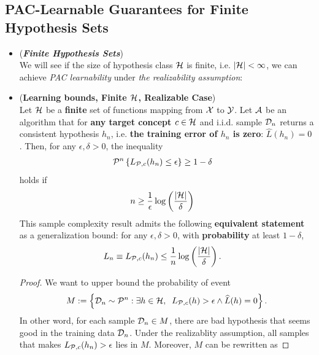 \documentclass[11pt]{article}
\begin{document}
\subsection{PAC-Learnable Guarantees for Finite Hypothesis Sets}
\begin{itemize}
\item \begin{remark} (\emph{\textbf{Finite Hypothesis Sets}})\\
We will see if the size of hypothesis class ${\mathcal H}$ is finite, i.e. $\left\lvert {\mathcal H} \right\rvert < \infty$, we can achieve \emph{PAC learnability} under \emph{the realizability assumption}:
\end{remark}

\item \begin{proposition} (\textbf{Learning bounds, Finite ${\mathcal H}$, Realizable Case}) \citep{mohri2018foundations}\\
Let ${\mathcal H}$ be a \textbf{finite} set of functions mapping from ${\mathcal X}$ to ${\mathcal Y}$. Let ${\mathcal A}$ be an algorithm that for \textbf{any target concept $c \in {\mathcal H}$} and i.i.d. sample ${\mathcal D}_n$ returns a consistent hypothesis $h_n$, i.e. \textbf{the training error of $h_n$ is zero}: $\widehat{L}(h_n) = 0$.
Then, for any $\epsilon, \delta > 0$, the inequality 
\begin{align*}
{\mathcal P}^{n}\left\{ L_{{\mathcal P}, c}(h_n) \le \epsilon\right\} &\ge  1 - \delta
\end{align*} holds if
\begin{align}
n &\ge \frac{1}{\epsilon}\log\left(\frac{\left\lvert {\mathcal H} \right\rvert}{\delta}\right) \label{eqn: pac_sample_complexity_finite_case}
\end{align}
This sample complexity result admits the following \textbf{equivalent statement} as a generalization bound: for any $\epsilon, \delta > 0$, with \textbf{probability} at least $1 - \delta$,
\begin{align}
L_n \equiv L_{{\mathcal P}, c}(h_n) &\le \frac{1}{n}\log\left(\frac{\left\lvert {\mathcal H} \right\rvert}{\delta}\right). \label{eqn: pac_sample_complexity_finite_case_consistency}
\end{align}
\end{proposition}
\begin{proof}
We want to upper bound the probability of event 
\begin{align*}
M := \left\{{\mathcal D}_n \sim {\mathcal P}^n: \exists h \in {\mathcal H}, \;\; L_{{\mathcal P}, c}(h) > \epsilon \land \widehat{L}(h) = 0\right\}.
\end{align*} In other word, for each sample ${\mathcal D}_n \in M$, there are bad hypothesis that seems good in the training data ${\mathcal D}_n$. Under the realizablity assumption, all samples that makes $ L_{{\mathcal P}, c}(h_n) > \epsilon$ lies in $M$. Moreover, $M$ can be rewritten as

\end{proof}
\end{itemize}
\end{document}
